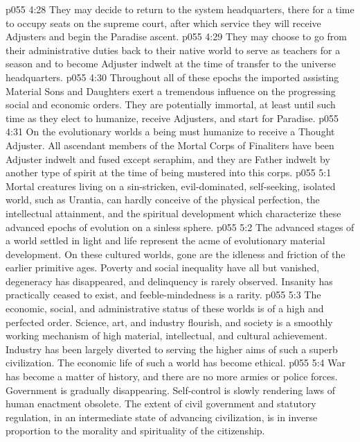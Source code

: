 \pc \vs p055 4:28 \bibnobreakspace They may decide to return to the system headquarters, there for a time to occupy seats on the supreme court, after which service they will receive Adjusters and begin the Paradise ascent.
\pc \vs p055 4:29 \bibnobreakspace They may choose to go from their administrative duties back to their native world to serve as teachers for a season and to become Adjuster indwelt at the time of transfer to the universe headquarters.
\pc \vs p055 4:30 Throughout all of these epochs the imported assisting Material Sons and Daughters exert a tremendous influence on the progressing social and economic orders. They are potentially immortal, at least until such time as they elect to humanize, receive Adjusters, and start for Paradise.
\vs p055 4:31 On the evolutionary worlds a being must humanize to receive a Thought Adjuster. All ascendant members of the Mortal Corps of Finaliters have been Adjuster indwelt and fused except seraphim, and they are Father indwelt by another type of spirit at the time of being mustered into this corps.\plusone
{}
\vs p055 5:1 Mortal creatures living on a sin\hyp{}stricken, evil\hyp{}dominated, self\hyp{}seeking, isolated world, such as Urantia, can hardly conceive of the physical perfection, the intellectual attainment, and the spiritual development which characterize these advanced epochs of evolution on a sinless sphere.
\vs p055 5:2 The advanced stages of a world settled in light and life represent the acme of evolutionary material development. On these cultured worlds, gone are the idleness and friction of the earlier primitive ages. Poverty and social inequality have all but vanished, degeneracy has disappeared, and delinquency is rarely observed. Insanity has practically ceased to exist, and feeble\hyp{}mindedness is a rarity.
\vs p055 5:3 The economic, social, and administrative status of these worlds is of a high and perfected order. Science, art, and industry flourish, and society is a smoothly working mechanism of high material, intellectual, and cultural achievement. Industry has been largely diverted to serving the higher aims of such a superb civilization. The economic life of such a world has become ethical.\plusone
\vs p055 5:4 War has become a matter of history, and there are no more armies or police forces. Government is gradually disappearing. Self\hyp{}control is slowly rendering laws of human enactment obsolete. The extent of civil government and statutory regulation, in an intermediate state of advancing civilization, is in inverse proportion to the morality and spirituality of the citizenship.
